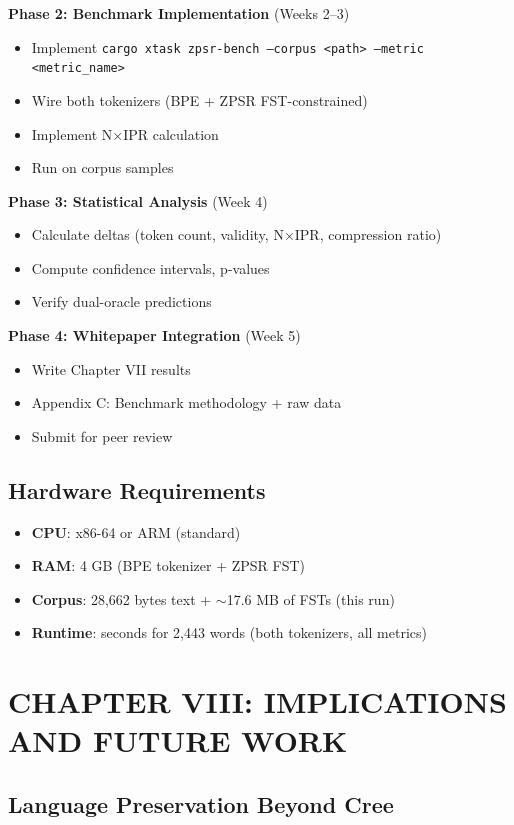 \documentclass[11pt,oneside]{article}
\begin{document}
\textbf{Phase 2: Benchmark Implementation} (Weeks 2--3)
\begin{itemize}
  \item Implement \texttt{cargo xtask zpsr-bench --corpus <path> --metric <metric\_name>}
  \item Wire both tokenizers (BPE + ZPSR FST-constrained)
  \item Implement N×IPR calculation
  \item Run on corpus samples
\end{itemize}

\textbf{Phase 3: Statistical Analysis} (Week 4)
\begin{itemize}
  \item Calculate deltas (token count, validity, N×IPR, compression ratio)
  \item Compute confidence intervals, p-values
  \item Verify dual-oracle predictions
\end{itemize}

\textbf{Phase 4: Whitepaper Integration} (Week 5)
\begin{itemize}
  \item Write Chapter VII results
  \item Appendix C: Benchmark methodology + raw data
  \item Submit for peer review
\end{itemize}

\subsection{Hardware Requirements}

\begin{itemize}
  \item \textbf{CPU}: x86-64 or ARM (standard)
  \item \textbf{RAM}: 4 GB (BPE tokenizer + ZPSR FST)
  \item \textbf{Corpus}: 28,662 bytes text + $\sim$17.6 MB of FSTs (this run)
  \item \textbf{Runtime}: seconds for 2,443 words (both tokenizers, all metrics)
\end{itemize}

\section{CHAPTER VIII: IMPLICATIONS AND FUTURE WORK}

\subsection{Language Preservation Beyond Cree}
\end{document}
